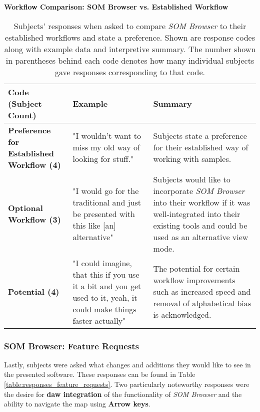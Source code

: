 \begin{table}[!htb]
  \renewcommand{\arraystretch}{1.2}
  \centering
  \textbf{Workflow Comparison: SOM Browser vs. Established Workflow} \\ [3mm]
  \footnotesize
  \colorbox{light-bg}{
  \begin{tabular}{ p{4.0cm} p{4.75cm} p{4.75cm} }
    \hline
    \textbf{Code (Subject Count)} & \textbf{Example} & \textbf{Summary} \\
    \hline
    \textbf{Preference for Established Workflow (4)}
    &
    "I wouldn't want to miss my old way of looking for stuff."
    &
    Subjects state a preference for their established way of working with
    samples.
    \\
    \textbf{Optional Workflow (3)}
    &
    "I would go for the traditional and just be presented with this like [an]
    alternative"
    &
    Subjects would like to incorporate \textit{SOM Browser} into their workflow
    if it was well-integrated into their existing tools and could be used as an
    alternative view mode.
    \\
    \textbf{Potential (4)}
    &
    "I could imagine, that this if you use it a bit and you get used to it,
    yeah, it could make things faster actually"
    &
    The potential for certain workflow improvements such as increased speed and
    removal of alphabetical bias is acknowledged.
    \\
  \end{tabular}}
  \caption[Workflow Comparison \textit{SOM Browser} vs. Established Workflow]
  {Subjects' responses when asked to compare \textit{SOM Browser} to their
  established workflows and state a preference. Shown are response codes along
  with example data and interpretive summary. The number shown in parentheses
  behind each code denotes how many individual subjects gave responses
  corresponding to that code.}
  \label{table:responses_workflow_comparison}
\end{table}


\subsubsection{SOM Browser: Feature Requests}
\label{subsubsec:feature_requests}
Lastly, subjects were asked what changes and additions they would like to see in
the presented software. These responses can be found in Table
\ref{table:responses_feature_requests}. Two particularly noteworthy responses
were the desire for \textbf{\gls{daw} integration} of the functionality of
\textit{SOM Browser} and the ability to navigate the map using
\textbf{Arrow keys}.

